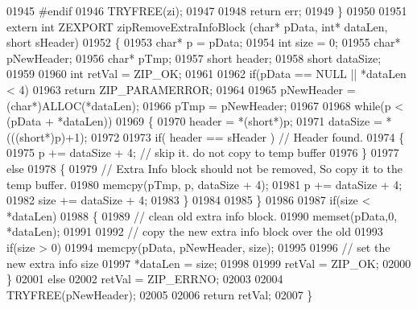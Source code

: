 \begin{DoxyCode}
01945 \textcolor{preprocessor}{#endif}
01946     TRYFREE(zi);
01947 
01948     \textcolor{keywordflow}{return} err;
01949 \}
01950 
01951 \textcolor{keyword}{extern} \textcolor{keywordtype}{int} ZEXPORT zipRemoveExtraInfoBlock (\textcolor{keywordtype}{char}* pData, \textcolor{keywordtype}{int}* dataLen, \textcolor{keywordtype}{short} sHeader)
01952 \{
01953   \textcolor{keywordtype}{char}* p = pData;
01954   \textcolor{keywordtype}{int} size = 0;
01955   \textcolor{keywordtype}{char}* pNewHeader;
01956   \textcolor{keywordtype}{char}* pTmp;
01957   \textcolor{keywordtype}{short} header;
01958   \textcolor{keywordtype}{short} dataSize;
01959 
01960   \textcolor{keywordtype}{int} retVal = ZIP\_OK;
01961 
01962   \textcolor{keywordflow}{if}(pData == NULL || *dataLen < 4)
01963     \textcolor{keywordflow}{return} ZIP\_PARAMERROR;
01964 
01965   pNewHeader = (\textcolor{keywordtype}{char}*)ALLOC(*dataLen);
01966   pTmp = pNewHeader;
01967 
01968   \textcolor{keywordflow}{while}(p < (pData + *dataLen))
01969   \{
01970     header = *(\textcolor{keywordtype}{short}*)p;
01971     dataSize = *(((\textcolor{keywordtype}{short}*)p)+1);
01972 
01973     \textcolor{keywordflow}{if}( header == sHeader ) \textcolor{comment}{// Header found.}
01974     \{
01975       p += dataSize + 4; \textcolor{comment}{// skip it. do not copy to temp buffer}
01976     \}
01977     \textcolor{keywordflow}{else}
01978     \{
01979       \textcolor{comment}{// Extra Info block should not be removed, So copy it to the temp buffer.}
01980       memcpy(pTmp, p, dataSize + 4);
01981       p += dataSize + 4;
01982       size += dataSize + 4;
01983     \}
01984 
01985   \}
01986 
01987   \textcolor{keywordflow}{if}(size < *dataLen)
01988   \{
01989     \textcolor{comment}{// clean old extra info block.}
01990     memset(pData,0, *dataLen);
01991 
01992     \textcolor{comment}{// copy the new extra info block over the old}
01993     \textcolor{keywordflow}{if}(size > 0)
01994       memcpy(pData, pNewHeader, size);
01995 
01996     \textcolor{comment}{// set the new extra info size}
01997     *dataLen = size;
01998 
01999     retVal = ZIP\_OK;
02000   \}
02001   \textcolor{keywordflow}{else}
02002     retVal = ZIP\_ERRNO;
02003 
02004   TRYFREE(pNewHeader);
02005 
02006   \textcolor{keywordflow}{return} retVal;
02007 \}
\end{DoxyCode}
